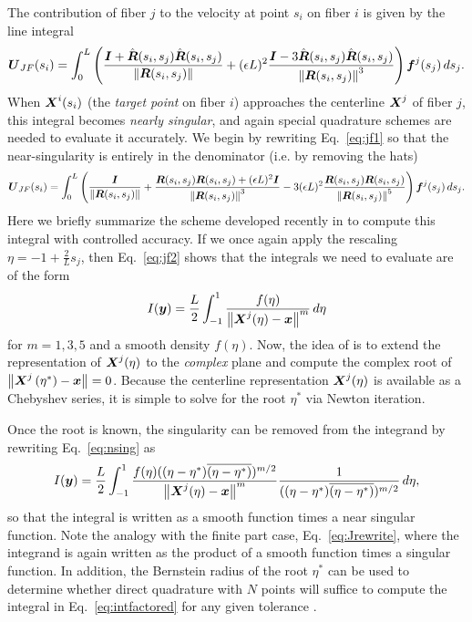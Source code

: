 The contribution of fiber $j$ to the velocity at point $s_i$ on fiber $i$ is given by the line integral
\begin{gather}
\label{eq:jf1}
\boldsymbol{U}_{JF}(s_i) =\int_0^L \left(\frac{\boldsymbol{I}+\hat{\boldsymbol{R}}(s_i,s_j)\hat{\boldsymbol{R}}(s_i,s_j)}{\left\Vert \boldsymbol{R}(s_i,s_j)\right\Vert} + (\epsilon L)^2 \frac{\boldsymbol{I}-3\hat{\boldsymbol{R}}(s_i,s_j)\hat{\boldsymbol{R}}(s_i,s_j)}{\left\Vert \boldsymbol{R}(s_i,s_j)\right\Vert^3}\right)\boldsymbol{f}^j(s_j) \, ds_j. 
\end{gather}
When $\boldsymbol{X}^i(s_i)$ (the \textit{target point} on fiber $i$) approaches the centerline $\boldsymbol{X}^j$ of fiber $j$, this integral becomes \textit{nearly singular}, and again special quadrature schemes are needed to evaluate it accurately. We begin by rewriting Eq.\ \eqref{eq:jf1} so that the near-singularity is entirely in the denominator (i.e. by removing the hats)
\begin{gather}
\label{eq:jf2}
\boldsymbol{U}_{JF}(s_i) =\int_0^L \left(\frac{\boldsymbol{I}}{\left\Vert \boldsymbol{R}(s_i,s_j)\right\Vert}+\frac{\boldsymbol{R}(s_i,s_j)\boldsymbol{R}(s_i,s_j)+(\epsilon L)^2 \boldsymbol{I}}{\left\Vert \boldsymbol{R}(s_i,s_j)\right\Vert^3} -3(\epsilon L)^2 \frac{\boldsymbol{R}(s_i,s_j)\boldsymbol{R}(s_i,s_j)}{\left\Vert \boldsymbol{R}(s_i,s_j)\right\Vert^5}\right)\boldsymbol{f}^j(s_j) \, ds_j. 
\end{gather}
Here we briefly summarize the scheme developed recently in \cite[Section~3]{barLud} to compute this integral with controlled accuracy. If we once again apply the rescaling $\eta = -1+\frac{2}{L}s_j$, then Eq.\ \eqref{eq:jf2} shows that the integrals we need to evaluate are of the form
\begin{equation}
\label{eq:nsing}
I(\boldsymbol{y}) = \frac{L}{2}\int_{-1}^1 \frac{f(\eta)}{\left\Vert \boldsymbol{X}^j(\eta) -\boldsymbol{x}\right\Vert^m} \, d\eta
\end{equation}
for $m=1, 3, 5$ and a smooth density $f(\eta)$. Now, the idea of \cite{barLud} is to extend the representation of $\boldsymbol{X}^j(\eta)$ to the \textit{complex} plane and compute the complex root of $\left\Vert \boldsymbol{X}^j\left(\eta^*\right)-\boldsymbol{x}\right\Vert=0$. Because the centerline representation $\boldsymbol{X}^j(\eta)$ is available as a Chebyshev series, it is simple to solve for the root $\eta^*$ via Newton iteration. 

Once the root is known, the singularity can be removed from the integrand by rewriting Eq.\ \eqref{eq:nsing} as
\begin{equation}
\label{eq:intfactored}
I(\boldsymbol{y}) = \frac{L}{2}\int_{-1}^1 \frac{f(\eta)((\eta-\eta^*)\overline{(\eta-\eta^*)})^{m/2}}{\left\Vert \boldsymbol{X}^j(\eta) -\boldsymbol{x}\right\Vert^m} \frac{1}{((\eta-\eta^*)\overline{(\eta-\eta^*)})^{m/2}}\, d\eta, 
\end{equation}
so that the integral is written as a smooth function times a near singular function. Note the analogy with the finite part case, Eq.\ \eqref{eq:Jrewrite}, where the integrand is again written as the product of a smooth function times a singular function. In addition, the Bernstein radius of the root $\eta^*$ can be used to determine whether direct quadrature with $N$ points will suffice to compute the integral in Eq.\ \eqref{eq:intfactored} for any given tolerance \cite{barLud}.

